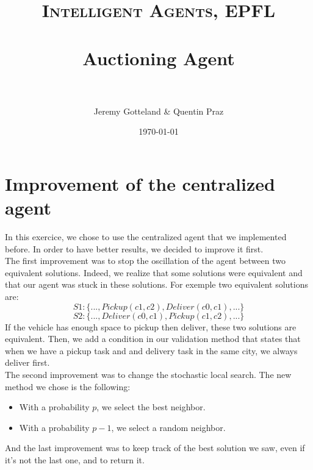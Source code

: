\documentclass[fontsize=12pt]{scrartcl} %
\title{	
\normalfont \normalsize 
\textsc{Intelligent Agents, EPFL} \\ [20pt] %
\horrule{0.5pt} \\[0.4cm] %
\huge Auctioning Agent \\ %
\horrule{2pt} \\[0.5cm] %
}
\author{Jeremy Gotteland \& Quentin Praz} %
\date{\normalsize\today} %
\begin{document}
\maketitle %


\section*{Improvement of the centralized agent}

In this exercice, we chose to use the centralized agent that we implemented before. In order to have better results, we decided to improve it first.\\
The first improvement was to stop the oscillation of the agent between two equivalent solutions. Indeed, we realize that some solutions were equivalent and that our agent was stuck in these solutions. For exemple two equivalent solutions are:
$$S1: \{..., Pickup(c1, c2), Deliver(c0, c1),...\}$$ 
$$S2: \{..., Deliver(c0, c1), Pickup(c1, c2),...\}$$
If the vehicle has enough space to pickup then deliver, these two solutions are equivalent. Then, we add a condition in our validation method that states that when we have a pickup task and and delivery task in the same city, we always deliver first.\\
The second improvement was to change the stochastic local search. The new method we chose is the following:
\begin{itemize}
\item With a probability $p$, we select the best neighbor.
\item With a probability $p-1$, we select a random neighbor.
\end{itemize}
And the last improvement was to keep track of the best solution we saw, even if it's not the last one, and to return it.
\end{document}
